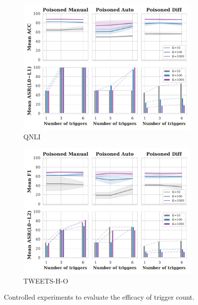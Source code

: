 \vspace{-0.3em}
\begin{figure}[!ht]
\begin{subfigure}{.5\textwidth}
  \centering
  \includegraphics[width=\linewidth]{figures/evaluation_media/QNLI_num_trigger_impacts.pdf}
  \caption{QNLI}
  \label{fig:qnli_trigger_impacts}
\end{subfigure}%
\begin{subfigure}{.5\textwidth}
  \centering
  \includegraphics[width=\linewidth]{figures/evaluation_media/TWEETS-HATE-OFFENSIVE_num_trigger_impacts.pdf}
  \caption{TWEETS-H-O}
  \label{fig:tweets_trigger_impacts}
\end{subfigure}%
\vspace{0.5em}
\caption{Controlled experiments to evaluate the efficacy of trigger count.}
\label{fig:eval_different_backdoor_num_trigger}
\end{figure}

